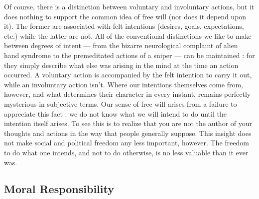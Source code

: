 \documentclass[a4paper,14pt]{extbook}
\begin{document}
Of course, there is a distinction between voluntary and involuntary actions, but it does nothing to support the common idea of free will (nor does it depend upon it).
The former are associated with felt intentions (desires, goals, expectations, etc.) while the latter are not.
All of the conventional distinctions we like to make between degrees of intent --- from the bizarre neurological complaint of alien hand syndrome to the premeditated actions of a sniper --- can be maintained :
for they simply describe what else was arising in the mind at the time an action occurred.
A voluntary action is accompanied by the felt intention to carry it out, while an involuntary action isn’t.
Where our intentions themselves come from, however, and what determines their character in every instant, remains perfectly mysterious in subjective terms.
Our sense of free will arises from a failure to appreciate this fact :
we do not know what we will intend to do until the intention itself arises.
To see this is to realize that you are not the author of your thoughts and actions in the way that people generally suppose.
This insight does not make social and political freedom any less important, however.
The freedom to do what one intends, and not to do otherwise, is no less valuable than it ever was.

\subsection{Moral Responsibility}
\end{document}
